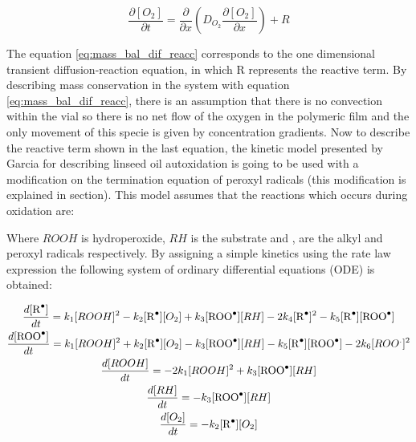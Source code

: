 \begin{refsection}
\begin{equation}
    \frac{\partial [O_2]}{\partial t}= \frac{\partial}{\partial x} \left(D_{O_2}\frac{\partial [O_2] }{\partial x}\right)+ R
    \label{eq:mass_bal_dif_reacc}
\end{equation}

The equation \ref{eq:mass_bal_dif_reacc} corresponds to the one dimensional transient diffusion-reaction equation, in which R represents the reactive term. By describing mass conservation in the system with equation \ref{eq:mass_bal_dif_reacc}, there is an assumption that there is no convection within the vial so there is no net flow of the oxygen in the polymeric film and the only movement of this specie is given by concentration gradients. Now to describe the reactive term shown in the last equation, the kinetic model presented by Garcia \cite{GarciaMora2015KineticScavengers} for describing linseed oil autoxidation is going to be used with a modification on the termination equation of peroxyl radicals (this modification is explained in section). This model assumes that the reactions which occurs during oxidation are:


Where $ROOH$ is hydroperoxide, $RH$ is the substrate and ,  are the alkyl and peroxyl radicals respectively. By assigning a simple kinetics using the rate law expression the following system of ordinary differential equations (ODE) is obtained:

\begin{gather}
    \frac{d[\ce{R^.}]}{dt}= k_1[ROOH]^2 - k_2 [\ce{R^.}][O_2]+ k_3[\ce{ROO^.}][RH]-2k_4[\ce{R^.}]^2 -k_5[\ce{R^.}][\ce{ROO^.}]\label{eq:consum_R.}\\
    \frac{d[\ce{ROO^.}]}{dt}= k_1[ROOH]^2 + k_2 [\ce{R^.}][O_2]- k_3[\ce{ROO^.}][RH]-k_5[\ce{R^.}][\ce{ROO^.}]-2k_6 [ROO^.]^2\\
   \frac{d[ROOH]}{dt}= -2k_1[ROOH]^2 + k_3[\ce{ROO^.}][RH]\\
   \frac{d[RH]}{dt}=-k_3[\ce{ROO^.}][RH]\label{eq:consum_RH}\\
   \frac{d[O_2]}{dt}= -k_2[\ce{R^.}][O_2]\label{eq:consum_O2}
\end{gather}


\end{refsection}
